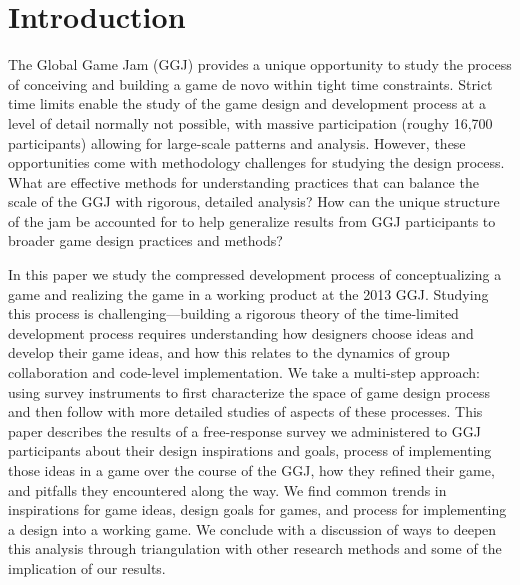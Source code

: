 \documentclass{sig-alternate}
\begin{document}
\section{Introduction}
The Global Game Jam (GGJ) provides a unique opportunity to study the process of conceiving and building a game de novo within tight time constraints. Strict time limits enable the study of the game design and development process at a level of detail normally not possible, with massive participation (roughy 16,700 participants) allowing for large-scale patterns and analysis. 
However, these opportunities come with methodology challenges for studying the design process. What are effective methods for understanding practices that can balance the scale of the GGJ with rigorous, detailed analysis? How can the unique structure of the jam be accounted for to help generalize results from GGJ participants to broader game design practices and methods?


In this paper we study the compressed development process of conceptualizing a game and realizing the game in a working product at the 2013 GGJ. Studying this process is challenging---building a rigorous theory of the time-limited development process requires understanding how designers choose ideas and develop their game ideas, and how this relates to the dynamics of group collaboration and code-level implementation. 
We take a multi-step approach: 
using survey instruments to first characterize the space of game design process
and then follow with more detailed studies of aspects of these processes.
This paper describes the results of a free-response survey we administered to GGJ participants about their design inspirations and goals, process of implementing those ideas in a game over the course of the GGJ, how they refined their game, and pitfalls they encountered along the way. 
We find common trends in inspirations for game ideas, design goals for games, and process for implementing a design into a working game.
We conclude with a discussion of ways to deepen this analysis through triangulation with other research methods and some of the implication of our results.


\end{document}
